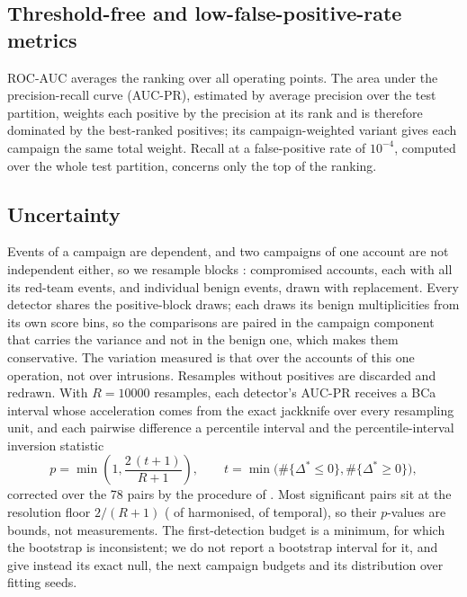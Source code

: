 \documentclass[11pt,a4paper]{article}
\begin{document}
\subsection{Threshold-free and low-false-positive-rate metrics}
ROC-AUC averages the ranking over all operating points. The area under the precision-recall curve (AUC-PR), estimated by average precision over the test partition, weights each positive by the precision at its rank and is therefore dominated by the best-ranked positives; its campaign-weighted variant gives each campaign the same total weight. Recall at a false-positive rate of $10^{-4}$, computed over the whole test partition, concerns only the top of the ranking.

\subsection{Uncertainty}
\label{sec:uncertainty}
Events of a campaign are dependent, and two campaigns of one account are not independent either, so we resample blocks \parencite{efron1993,field2007}: compromised accounts, each with all its red-team events, and individual benign events, drawn with replacement. Every detector shares the positive-block draws; each draws its benign multiplicities from its own score bins, so the comparisons are paired in the campaign component that carries the variance and not in the benign one, which makes them conservative. The variation measured is that over the accounts of this one operation, not over intrusions. Resamples without positives are discarded and redrawn. With $R = \num{10000}$ resamples, each detector's AUC-PR receives a BCa interval \parencite{efron1987} whose acceleration comes from the exact jackknife over every resampling unit, and each pairwise difference a percentile interval and the percentile-interval inversion statistic
\begin{equation}
p = \min\!\left(1, \frac{2\,(t+1)}{R+1}\right), \qquad t = \min\bigl(\#\{\Delta^{*} \le 0\}, \#\{\Delta^{*} \ge 0\}\bigr),
\end{equation}
corrected over the 78 pairs by the procedure of \textcite{holm1979}. Most significant pairs sit at the resolution floor $2/(R+1)$ (\HarmPairsAtFloor{} of \HarmPairsSignificant{} harmonised, \TempPairsAtFloor{} of \TempPairsSignificant{} temporal), so their $p$-values are bounds, not measurements. The first-detection budget is a minimum, for which the bootstrap is inconsistent; we do not report a bootstrap interval for it, and give instead its exact null, the next campaign budgets and its distribution over fitting seeds.
\end{document}
